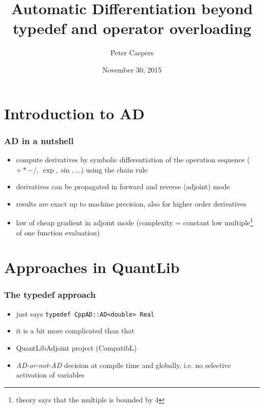 \documentclass{beamer}
\begin{document}
\title{Automatic Differentiation beyond typedef and operator overloading}
\author{Peter Caspers}
\date{November 30, 2015}

\frame{\titlepage}


\section{Introduction to AD}

\begin{frame}[fragile]
\frametitle{AD in a nutshell}
\begin{itemize}
\item compute derivatives by symbolic differentiation of the operation sequence ($+*-/$, $\exp, \sin, ...$) using the chain rule
\item derivatives can be propagated in forward and reverse (adjoint) mode
\item results are exact up to machine precision, also for higher order derivatives
\item law of cheap gradient in adjoint mode (complexity = constant low multiple\footnote{theory says that the multiple is bounded by 4} of one function evaluation)
\end{itemize}
\end{frame}

\section{Approaches in QuantLib}

\begin{frame}[fragile]
\frametitle{The typedef approach}
\begin{itemize}
\item just says \verb+typedef CppAD::AD<double> Real+
\item it is a bit more complicated than that
\item QuantLibAdjoint project (CompatibL)
\item \textit{AD-or-not-AD} decision at compile time and globally, i.e. no selective activation of variables
\end{itemize}
\end{frame}
\end{document}
